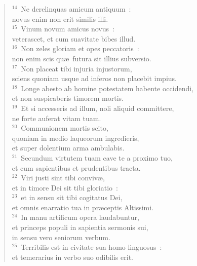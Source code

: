 \begin{flushleft}\begin{verse}${}^{14}$~Ne derelinquas amicum antiquum~:\\ novus enim non erit similis illi.\\
${}^{15}$~Vinum novum amicus novus~:\\ veterascet, et cum suavitate bibes illud.\\
${}^{16}$~Non zeles gloriam et opes peccatoris~:\\ non enim scis qu\ae\ futura sit illius subversio.\\
${}^{17}$~Non placeat tibi injuria injustorum,\\ sciens quoniam usque ad inferos non placebit impius.\\
${}^{18}$~Longe abesto ab homine potestatem habente occidendi,\\ et non suspicaberis timorem mortis.\\
${}^{19}$~Et si accesseris ad illum, noli aliquid committere,\\ ne forte auferat vitam tuam.\\
${}^{20}$~Communionem mortis scito,\\ quoniam in medio laqueorum ingredieris,\\ et super dolentium arma ambulabis.\\
${}^{21}$~Secundum virtutem tuam cave te a proximo tuo,\\ et cum sapientibus et prudentibus tracta.\\
${}^{22}$~Viri justi sint tibi conviv\ae ,\\ et in timore Dei sit tibi gloriatio~:\\
${}^{23}$~et in sensu sit tibi cogitatus Dei,\\ et omnis enarratio tua in pr\ae ceptis Altissimi.\\
${}^{24}$~In manu artificum opera laudabuntur,\\ et princeps populi in sapientia sermonis sui,\\ in sensu vero seniorum verbum.\\
${}^{25}$~Terribilis est in civitate sua homo linguosus~:\\ et temerarius in verbo suo odibilis erit.\end{verse}\end{flushleft}


